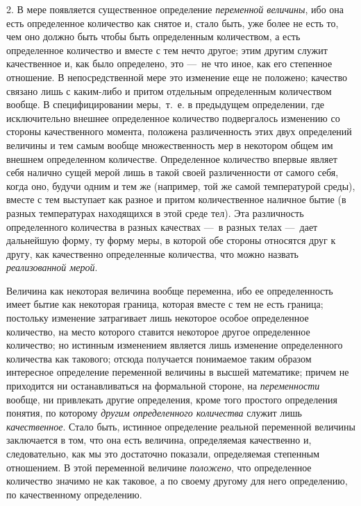 2. В мере появляется существенное определение
{\em переменной величины}, ибо она есть определенное
количество как снятое и, стало быть, уже более не есть то, чем оно должно
быть чтобы быть определенным количеством, а есть определенное количество и
вместе с тем нечто другое; этим другим служит качественное и, как было
определено, это —~не что иное, как его степенное отношение. В
непосредственной мере это изменение еще не положено; качество связано лишь
с каким-либо и притом отдельным определенным количеством вообще. В
специфицировании меры,~т.~е. в предыдущем определении, где исключительно
внешнее определенное количество подвергалось изменению со стороны
качественного момента, положена различенность этих двух определений
величины и тем самым вообще множественность мер в некотором общем им
внешнем определенном количестве. Определенное количество впервые являет
себя налично сущей мерой лишь в такой своей различенности от самого себя,
когда оно, будучи одним и тем же (например, той же самой температурой
среды), вместе с тем выступает как разное и притом количественное наличное
бытие (в разных температурах находящихся в этой среде тел). Эта различность
определенного количества в разных качествах —~в разных телах —~дает
дальнейшую форму, ту форму меры, в которой обе стороны относятся друг к
другу, как качественно определенные количества, что можно назвать
{\em реализованной мерой}.

Величина как некоторая величина вообще переменна, ибо ее определенность
имеет бытие как некоторая граница, которая вместе с тем не есть граница;
постольку изменение затрагивает лишь некоторое особое определенное
количество, на место которого ставится некоторое другое определенное
количество; но истинным изменением является лишь изменение определенного
количества как такового; отсюда получается понимаемое таким образом
интересное определение переменной величины в высшей математике; причем не
приходится ни останавливаться на формальной стороне, на
{\em переменности} вообще, ни привлекать другие
определения, кроме того простого определения понятия, по которому
{\em другим определенного количества} служит лишь
{\em качественное}. Стало быть, истинное определение
реальной переменной величины заключается в том, что она есть величина,
определяемая качественно и, следовательно, как мы это достаточно показали,
определяемая степенным отношением. В этой переменной величине
{\em положено}, что определенное количество значимо не
как таковое, а по своему другому для него определению, по качественному
определению.

